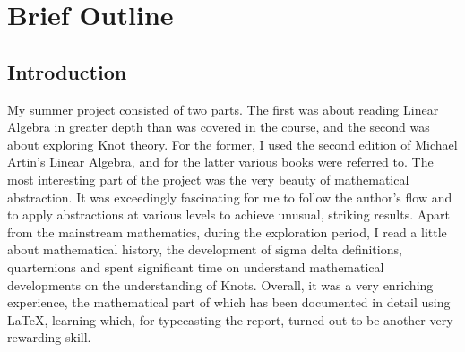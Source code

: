 \chapter{Brief Outline}

\section{Introduction}
My summer project consisted of two parts. The first was about reading Linear Algebra in greater depth than was covered in the course, and the second was about exploring Knot theory. For the former, I used the second edition of Michael Artin's Linear Algebra, and for the latter various books were referred to. The most interesting part of the project was the very beauty of mathematical abstraction. It was exceedingly fascinating for me to follow the author's flow and to apply abstractions at various levels to achieve unusual, striking results. Apart from the mainstream mathematics, during the exploration period, I read a little about mathematical history, the development of sigma delta definitions, quarternions and spent significant time on understand mathematical developments on the understanding of Knots. Overall, it was a very enriching experience, the mathematical part of which has been documented in detail using LaTeX, learning which, for typecasting the report, turned out to be another very rewarding skill.

